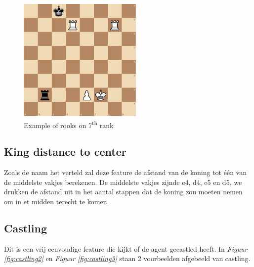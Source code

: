 \documentclass[a4paper,openany]{uantwerpenassignment}
\newcommand{\figref}[1]{\textit{Figuur \ref{#1}}}
\newcommand{\ts}{\textsuperscript}
\begin{document}
\begin{figure}[h]
    \centering
    \includegraphics[width=170pt]{images/rooks7rank.png}
    \caption{Example of rooks on 7\ts{th} rank}
    \label{fig:rooks7rank}
\end{figure}


\subsection{King distance to center}
Zoals de naam het verteld zal deze feature de afstand van de koning tot één van de middelste vakjes berekenen. De middelste vakjes zijnde e4, d4, e5 en d5, we drukken de afstand uit in het aantal stappen dat de koning zou moeten nemen om in et midden terecht te komen.

\subsection{Castling}

Dit is een vrij eenvoudige feature die kijkt of de agent gecastled heeft. In \figref{fig:castling2} en \figref{fig:castling3} staan 2 voorbeelden afgebeeld van castling.
\end{document}
